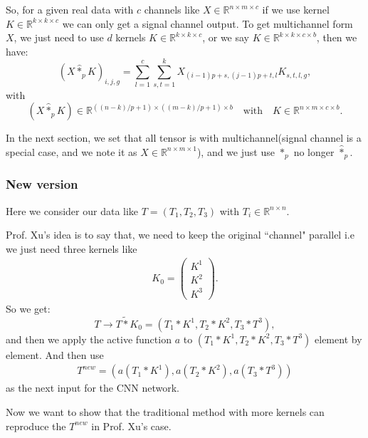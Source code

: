 So, for a given real data with $c$ channels like $X \in  \mathbb{R}^{n\times m \times c}$ if we use kernel $K \in \mathbb{R}^{k\times k \times c}$ we can only get a signal channel output. To get multichannel form $X$, we just need to use $d$ kernels $K \in \mathbb{R}^{k\times k \times c}$, or we say $K \in \mathbb{R}^{k\times k \times c \times b}$, then we have:
\begin{equation}\label{6.6}
(X \hat{\ast}_p K)_{i,j,g} = \sum_{l=1}^{c} \sum_{s, t = 1}^k X_{(i-1)p + s, (j-1)p + t,l} K_{s,t,l,g},
\end{equation}
with 
\begin{equation}
(X \hat{\ast}_p K) \in \mathbb{R}^{((n-k)/p + 1) \times ((m-k)/p+1) \times b} \quad \text{with} \quad K \in \mathbb{R}^{n \times m \times c \times b}.
\end{equation}

In the next section, we set that all tensor is with
multichannel(signal channel is a special case, and we note it as $X
\in \mathbb{R}^{n \times m \times 1}$), and we just use $\ast_p$ no
longer $\hat{\ast}_p$.

\subsubsection{New version}
Here we consider our data like $T = (T_1, T_2, T_3)$ with $T_i \in \mathbb{R}^{n\times n}$.

Prof. Xu's idea is to say that, we need to keep the original ``channel" parallel i.e we just need three kernels like 
\begin{align}
K_0 = \begin{pmatrix}
K^1 \\ K^2 \\ K^3
\end{pmatrix}.
\end{align} So we get:
\begin{equation}
T \to T\tilde{\ast} K_0 = (T_1 \ast K^1, T_2\ast K^2, T_3 \ast T^3),
\end{equation}
and then we apply the active function $a$ to $(T_1 \ast K^1, T_2\ast K^2, T_3 \ast T^3)$ element by element. And then use 
\begin{align}
T^{new} = (a(T_1 \ast K^1), a(T_2\ast K^2), a(T_3 \ast T^3))
\end{align} as the next input for the CNN network.
 
Now we want to show that the traditional method with more kernels can reproduce the $T^{new}$ in Prof. Xu's case.

